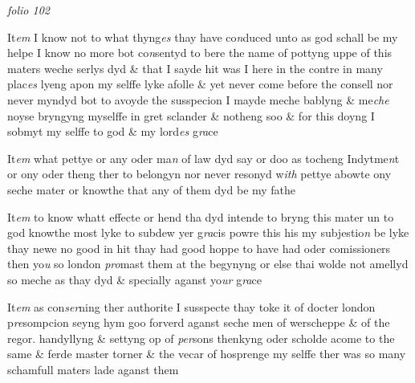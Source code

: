 \documentclass[12pt, a4paper]{book}
\begin{document}

\textit{folio 102}


 	
				\marginpar[\vspace{0.5cm}{\textcolor{Gray}{9.}}]{}
			
		\ifthenelse{\isodd{\thepage}}
		{\reversemarginpar}
		{\normalmarginpar}
		 It\textit{em} I know not to what thyng\textit{es} thay have co\textit{n}duced unto
 as god schall be my helpe I know no more bot co\textit{n}sentyd
 to bere the name of pottyng uppe of this maters weche
 serlys dyd \& that I sayde hit was I here in the contre
 in many plac\textit{es} lyeng apon my selffe lyke afolle \& yet
 never come before the consell nor never myndyd bot to
 avoyde the susspecion I mayde meche bablyng \& me\textit{che} noyse
 bryngyng myselffe in gret sclander \& notheng soo \& for
 this doyng I sobmyt my selffe to god \& my lord\textit{es} g\textit{ra}ce
 	
				\marginpar[\vspace{0.5cm}{\textcolor{Gray}{10.}}]{}
			
		\ifthenelse{\isodd{\thepage}}
		{\reversemarginpar}
		{\normalmarginpar}
		 It\textit{em} what pettye or any oder ma\textit{n} of law dyd say or doo
 as tocheng Indytme\textit{n}t or ony oder theng ther to belongyn
 nor never resonyd w\textit{ith} pettye abowte ony seche mater
 or knowthe that any of them dyd be my fathe
 	
				\marginpar[\vspace{0.5cm}{\textcolor{Gray}{11.}}]{}
			
		\ifthenelse{\isodd{\thepage}}
		{\reversemarginpar}
		{\normalmarginpar}
		 It\textit{em} to know whatt effecte or hend tha dyd intende to bryng
 		this mater un to god knowthe most lyke to subdew yer
 g\textit{ra}cis powre this his my subjestio\textit{n} be lyke thay newe
 no good in hit thay had good hoppe to have had
 oder comissioners then yo\textit{u} so london \textit{pro}mast them
 at the begynyng or else thai wolde not amellyd so
 meche as thay dyd \& specially aganst yo\textit{ur} g\textit{ra}ce
 	
				\marginpar[\vspace{0.5cm}{\textcolor{Gray}{12.}}]{}
			
		\ifthenelse{\isodd{\thepage}}
		{\reversemarginpar}
		{\normalmarginpar}
		 It\textit{em} as con\textit{ser}ning ther authorite I susspecte thay toke
 		it of docter london p\textit{re}sompcion seyng hym goo forverd
 aganst seche men of werscheppe \& of the regor.
 handyllyng \& settyng op of \textit{per}sons thenkyng oder
 		scholde acome to the same \& ferde master torner \&
 the vecar of hosprenge my selffe ther was so many
 schamfull maters lade aganst them
 
\end{document}
